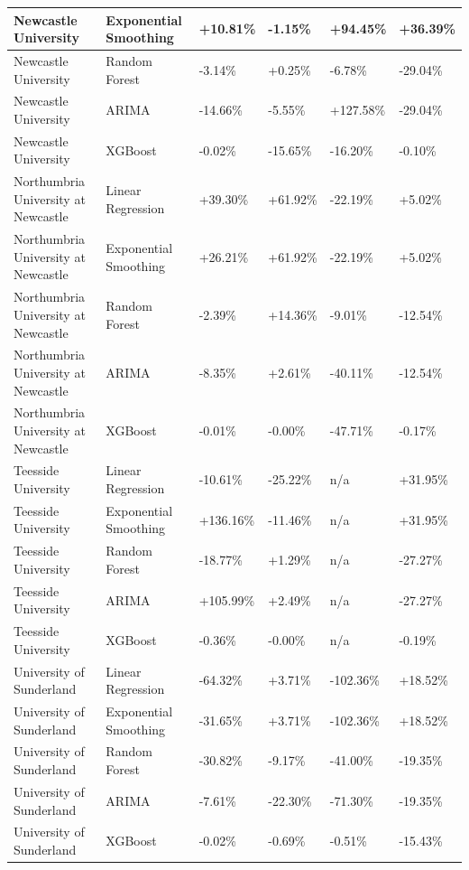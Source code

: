 \documentclass[journal,onecolumn, 10pt,draftclsnofoot]{IEEEtran}
\begin{document}
\begin{table}[h]
{\begin{tabular}{|l|l|l|l|l|l|}
\hline Newcastle University & Exponential Smoothing & +10.81\% & -1.15\% & +94.45\% & +36.39\% \\
\hline Newcastle University & Random Forest & -3.14\% & +0.25\% & -6.78\% & -29.04\% \\
\hline Newcastle University & ARIMA & -14.66\% & -5.55\% & +127.58\% & -29.04\% \\
\hline Newcastle University & XGBoost & -0.02\% & -15.65\% & -16.20\% & -0.10\% \\
\hline Northumbria University at Newcastle & Linear Regression & +39.30\% & +61.92\% & -22.19\% & +5.02\% \\
\hline Northumbria University at Newcastle & Exponential Smoothing & +26.21\% & +61.92\% & -22.19\% & +5.02\% \\
\hline Northumbria University at Newcastle & Random Forest & -2.39\% & +14.36\% & -9.01\% & -12.54\% \\
\hline Northumbria University at Newcastle & ARIMA & -8.35\% & +2.61\% & -40.11\% & -12.54\% \\
\hline Northumbria University at Newcastle & XGBoost & -0.01\% & -0.00\% & -47.71\% & -0.17\% \\
\hline Teesside University & Linear Regression & -10.61\% & -25.22\% & n/a & +31.95\% \\
\hline Teesside University & Exponential Smoothing & +136.16\% & -11.46\% & n/a & +31.95\% \\
\hline Teesside University & Random Forest & -18.77\% & +1.29\% & n/a & -27.27\% \\
\hline Teesside University & ARIMA & +105.99\% & +2.49\% & n/a & -27.27\% \\
\hline Teesside University & XGBoost & -0.36\% & -0.00\% & n/a & -0.19\% \\
\hline University of Sunderland & Linear Regression & -64.32\% & +3.71\% & -102.36\% & +18.52\% \\
\hline University of Sunderland & Exponential Smoothing & -31.65\% & +3.71\% & -102.36\% & +18.52\% \\
\hline University of Sunderland & Random Forest & -30.82\% & -9.17\% & -41.00\% & -19.35\% \\
\hline University of Sunderland & ARIMA & -7.61\% & -22.30\% & -71.30\% & -19.35\% \\
\hline University of Sunderland & XGBoost & -0.02\% & -0.69\% & -0.51\% & -15.43\% \\
\hline
\end{tabular}
}
\label{tab:forecasted-trends}
\end{table}
\end{document}
